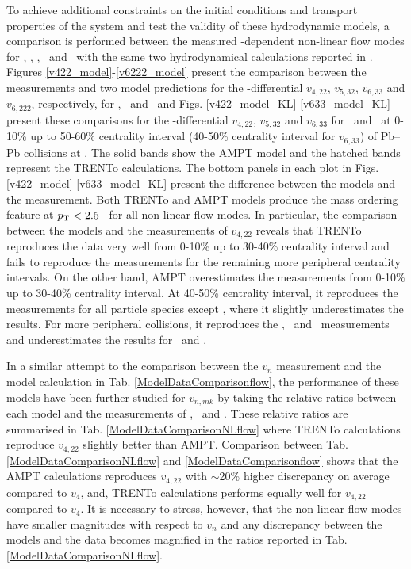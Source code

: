 To achieve additional constraints on the initial conditions and transport properties of the system and test the validity of these hydrodynamic models, a comparison is performed between the measured \pT-dependent non-linear flow modes for \pion, \kaon, \proton, \Ks~and \lambdas~with the same two hydrodynamical calculations reported in \cite{Zhao:2017yhj}. Figures \ref{v422_model}-\ref{v6222_model} present the comparison between the measurements and two model predictions for the \pT-differential $v_{4,22}$, $v_{5,32}$, $v_{6,33}$ and $v_{6,222}$, respectively, for \pion, \kaon~and \proton~and Figs. \ref{v422_model_KL}-\ref{v633_model_KL} present these comparisons for the \pT-differential $v_{4,22}$, $v_{5,32}$ and $v_{6,33}$ for \Ks~and \lambdas~at 0-10\% up to 50-60\% centrality interval (40-50\% centrality interval for $v_{6,33}$) of Pb--Pb collisions at \sNN. The solid bands show the AMPT model and the hatched bands represent the TRENTo calculations. The bottom panels in each plot in Figs. \ref{v422_model}-\ref{v633_model_KL} present the difference between the models and the measurement. Both TRENTo and AMPT models produce the mass ordering feature at $p_{\rm{T}}<2.5$ \GeV~for all non-linear flow modes. In particular, the comparison between the models and the measurements of $v_{4,22}$ reveals that TRENTo reproduces the data very well from 0-10\% up to 30-40\% centrality interval and fails to reproduce the measurements for the remaining more peripheral centrality intervals. On the other hand, AMPT overestimates the measurements from 0-10\% up to 30-40\% centrality interval. At 40-50\% centrality interval, it reproduces the measurements for all particle species except \pion, where it slightly underestimates the results. For more peripheral collisions, it reproduces the \kaon, \proton~and \lambdas~measurements and underestimates the results for \pion~and \Ks. 

In a similar attempt to the comparison between the $v_{n}$ measurement and the model calculation in Tab. \ref{ModelDataComparisonflow}, the performance of these models have been further studied for $v_{n,mk}$ by taking the relative ratios between each model and the measurements of \pion, \kaon~and \proton. These relative ratios are summarised in Tab. \ref{ModelDataComparisonNLflow} where TRENTo calculations reproduce $v_{4,22}$ slightly better than AMPT. Comparison between Tab. \ref{ModelDataComparisonNLflow} and \ref{ModelDataComparisonflow} shows that the AMPT calculations reproduces $v_{4,22}$ with $\sim$20\% higher discrepancy on average compared to $v_{4}$, and, TRENTo calculations performs equally well for $v_{4,22}$ compared to $v_{4}$. It is necessary to stress, however, that the non-linear flow modes have smaller magnitudes with respect to $v_{n}$ and any discrepancy between the models and the data becomes magnified in the ratios reported in Tab. \ref{ModelDataComparisonNLflow}. 


